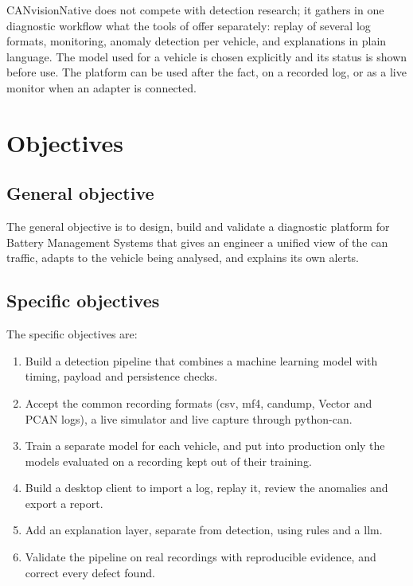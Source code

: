 CANvisionNative does not compete with detection research; it gathers in one diagnostic workflow what the tools of  offer separately: replay of several log formats, monitoring, anomaly detection per vehicle, and explanations in plain language. The model used for a vehicle is chosen explicitly and its status is shown before use. The platform can be used after the fact, on a recorded log, or as a live monitor when an adapter is connected.

\section{Objectives}

\subsection{General objective}

The general objective is to design, build and validate a diagnostic platform for Battery Management Systems that gives an engineer a unified view of the \gls{can} traffic, adapts to the vehicle being analysed, and explains its own alerts.

\subsection{Specific objectives}

The specific objectives are:

\begin{enumerate}
    \item Build a detection pipeline that combines a machine learning model with timing, payload and persistence checks.
    \item Accept the common recording formats (\gls{csv}, \gls{mf4}, candump, Vector and PCAN logs), a live simulator and live capture through python-can.
    \item Train a separate model for each vehicle, and put into production only the models evaluated on a recording kept out of their training.
    \item Build a desktop client to import a log, replay it, review the anomalies and export a report.
    \item Add an explanation layer, separate from detection, using rules and a \gls{llm}.
    \item Validate the pipeline on real recordings with reproducible evidence, and correct every defect found.
\end{enumerate}

